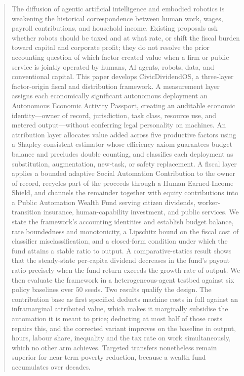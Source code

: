\documentclass[journal]{IEEEtran}
\theoremstyle{plain}
\theoremstyle{definition}
\begin{document}
\begin{abstract}
The diffusion of agentic artificial intelligence and embodied robotics is weakening the historical correspondence between human work, wages, payroll contributions, and household income. Existing proposals ask whether robots should be taxed and at what rate, or shift the fiscal burden toward capital and corporate profit; they do not resolve the prior accounting question of which factor created value when a firm or public service is jointly operated by humans, AI agents, robots, data, and conventional capital. This paper develops CivicDividendOS, a three-layer factor-origin fiscal and distribution framework. A measurement layer assigns each economically significant autonomous deployment an Autonomous Economic Activity Passport, creating an auditable economic identity---owner of record, jurisdiction, task class, resource use, and metered output---without conferring legal personality on machines. An attribution layer allocates value added across five productive factors using a Shapley-consistent estimator whose efficiency axiom guarantees budget balance and precludes double counting, and classifies each deployment as substitution, augmentation, new-task, or safety replacement. A fiscal layer applies a bounded adaptive Social Automation Contribution to the owner of record, recycles part of the proceeds through a Human Earned-Income Shield, and channels the remainder together with equity contributions into a Public Automation Wealth Fund serving citizen dividends, worker-transition insurance, human-capability investment, and public services. We state the framework's accounting identities and establish budget balance, rate boundedness and monotonicity, a Lipschitz bound on the fiscal cost of classifier misclassification, and a closed-form condition under which the fund attains a stable ratio to output. A comparative-statics result shows that the steady-state per-capita dividend decreases in the fund's payout ratio precisely when the fund return exceeds the growth rate of output. We then evaluate the framework in a heterogeneous-agent testbed against six policy baselines over 50 seeds. Two results qualify the design. The contribution base as first specified deducts machine costs in full against an inframarginal attributed value, which makes it marginally subsidise the automation it is meant to price; deducting at most half of those costs repairs this, and the corrected variant improves on the baseline in output, hours, labour share, inequality and the tax rate on work simultaneously, which no other arm achieves. Targeted transfers nonetheless remain superior for near-term poverty reduction, because a wealth fund accumulates over decades.
\end{abstract}
\end{document}

